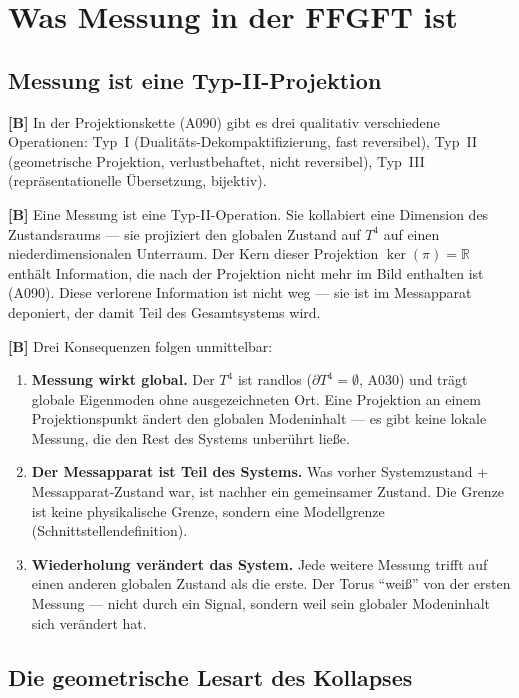 \section{Was Messung in der FFGFT ist}

\subsection{Messung ist eine Typ-II-Projektion}

\textbf{[B]} In der Projektionskette (A090) gibt es drei qualitativ
verschiedene Operationen: Typ~I (Dualitäts-Dekompaktifizierung, fast
reversibel), Typ~II (geometrische Projektion, verlustbehaftet, nicht
reversibel), Typ~III (repräsentationelle Übersetzung, bijektiv).

\textbf{[B]} Eine Messung ist eine Typ-II-Operation. Sie kollabiert eine
Dimension des Zustandsraums --- sie projiziert den globalen Zustand auf
$T^4$ auf einen niederdimensionalen Unterraum. Der Kern dieser Projektion
$\ker(\pi) = \mathbb{R}$ enthält Information, die nach der Projektion nicht
mehr im Bild enthalten ist (A090). Diese verlorene Information ist nicht weg ---
sie ist im Messapparat deponiert, der damit Teil des Gesamtsystems wird.

\textbf{[B]} Drei Konsequenzen folgen unmittelbar:

\begin{enumerate}[leftmargin=1.6em,itemsep=0.3em]
  \item \textbf{Messung wirkt global.} Der $T^4$ ist randlos
    ($\partial T^4 = \emptyset$, A030) und trägt globale Eigenmoden ohne
    ausgezeichneten Ort. Eine Projektion an einem Projektionspunkt ändert
    den globalen Modeninhalt --- es gibt keine lokale Messung, die den Rest
    des Systems unberührt ließe.
  \item \textbf{Der Messapparat ist Teil des Systems.} Was vorher
    Systemzustand + Messapparat-Zustand war, ist nachher ein gemeinsamer
    Zustand. Die Grenze ist keine physikalische Grenze, sondern eine
    Modellgrenze (Schnittstellendefinition).
  \item \textbf{Wiederholung verändert das System.} Jede weitere Messung
    trifft auf einen anderen globalen Zustand als die erste. Der Torus
    \enquote{weiß} von der ersten Messung --- nicht durch ein Signal,
    sondern weil sein globaler Modeninhalt sich verändert hat.
\end{enumerate}

\subsection{Die geometrische Lesart des Kollapses}

